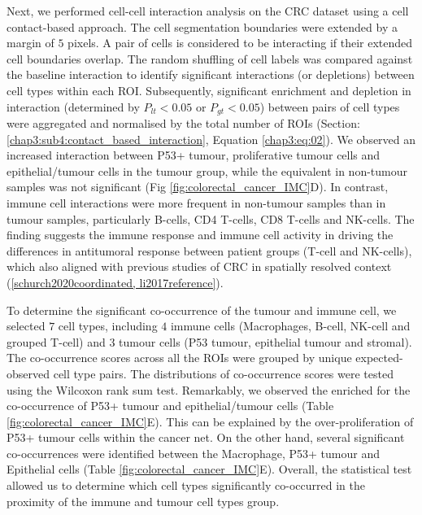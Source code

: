 Next, we performed cell-cell interaction analysis on the CRC dataset using a cell contact-based approach. The cell segmentation boundaries were extended by a margin of $5$ pixels. A pair of cells is considered to be interacting if their extended cell boundaries overlap. The random shuffling of cell labels was compared against the baseline interaction to identify significant interactions (or depletions) between cell types within each ROI. Subsequently, significant enrichment and depletion in interaction (determined by $P_{lt} < 0.05$ or $P_{gt}<0.05$) between pairs of cell types were aggregated and normalised by the total number of ROIs (Section: \ref{chap3:sub4:contact_based_interaction}, Equation \ref{chap3:eq:02}). We observed an increased interaction between P53+ tumour, proliferative tumour cells and epithelial/tumour cells in the tumour group, while the equivalent in non-tumour samples was not significant (Fig \ref{fig:colorectal_cancer_IMC}D). In contrast, immune cell interactions were more frequent in non-tumour samples than in tumour samples, particularly B-cells, CD4 T-cells, CD8 T-cells and NK-cells. The finding suggests the immune response and immune cell activity in driving the differences in antitumoral response between patient groups (\ie T-cell and NK-cells), which also aligned with previous studies of CRC in spatially resolved context (\ref{schurch2020coordinated, li2017reference}).

To determine the significant co-occurrence of the tumour and immune cell, we selected $7$ cell types, including $4$ immune cells (Macrophages, B-cell, NK-cell and grouped T-cell) and $3$ tumour cells (P53 tumour, epithelial tumour and stromal). The co-occurrence scores across all the ROIs were grouped by unique expected-observed cell type pairs. The distributions of co-occurrence scores were tested using the Wilcoxon rank sum test. Remarkably, we observed the enriched for the co-occurrence of P53+ tumour and epithelial/tumour cells (Table \ref{fig:colorectal_cancer_IMC}E). This can be explained by the over-proliferation of P53+ tumour cells within the cancer net. On the other hand, several significant co-occurrences were identified between the Macrophage,  P53+ tumour and Epithelial cells (Table \ref{fig:colorectal_cancer_IMC}E). Overall, the statistical test allowed us to determine which cell types significantly co-occurred in the proximity of the immune and tumour cell types group.   

